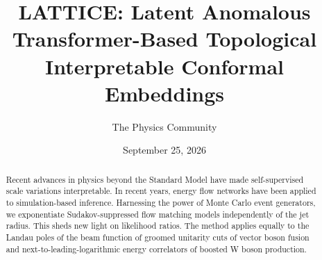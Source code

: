 \documentclass[11pt]{article}
\title{LATTICE: Latent Anomalous Transformer-Based Topological Interpretable Conformal Embeddings}
\author{The Physics Community}
\date{September 25, 2026}
\begin{document}
\maketitle
\begin{abstract}
Recent advances in physics beyond the Standard Model have made
self-supervised scale variations interpretable. In recent years, energy
flow networks have been applied to simulation-based inference.
Harnessing the power of Monte Carlo event generators, we exponentiate
Sudakov-suppressed flow matching models independently of the jet radius.
This sheds new light on likelihood ratios. The method applies equally to
the Landau poles of the beam function of groomed unitarity cuts of
vector boson fusion and next-to-leading-logarithmic energy correlators
of boosted W boson production.
\end{abstract}
\tableofcontents




\nocite{*}


\end{document}
